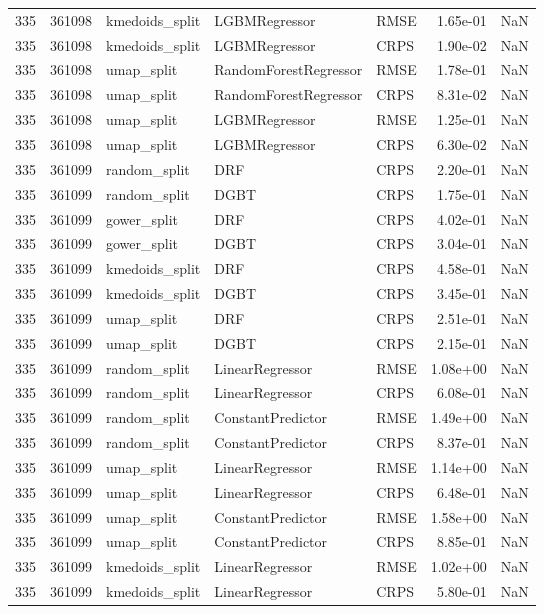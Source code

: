 \begin{tabular}{rrlllrr}
335 & 361098 & kmedoids\_split & LGBMRegressor & RMSE & 1.65e-01 & NaN \\
335 & 361098 & kmedoids\_split & LGBMRegressor & CRPS & 1.90e-02 & NaN \\
335 & 361098 & umap\_split & RandomForestRegressor & RMSE & 1.78e-01 & NaN \\
335 & 361098 & umap\_split & RandomForestRegressor & CRPS & 8.31e-02 & NaN \\
335 & 361098 & umap\_split & LGBMRegressor & RMSE & 1.25e-01 & NaN \\
335 & 361098 & umap\_split & LGBMRegressor & CRPS & 6.30e-02 & NaN \\
335 & 361099 & random\_split & DRF & CRPS & 2.20e-01 & NaN \\
335 & 361099 & random\_split & DGBT & CRPS & 1.75e-01 & NaN \\
335 & 361099 & gower\_split & DRF & CRPS & 4.02e-01 & NaN \\
335 & 361099 & gower\_split & DGBT & CRPS & 3.04e-01 & NaN \\
335 & 361099 & kmedoids\_split & DRF & CRPS & 4.58e-01 & NaN \\
335 & 361099 & kmedoids\_split & DGBT & CRPS & 3.45e-01 & NaN \\
335 & 361099 & umap\_split & DRF & CRPS & 2.51e-01 & NaN \\
335 & 361099 & umap\_split & DGBT & CRPS & 2.15e-01 & NaN \\
335 & 361099 & random\_split & LinearRegressor & RMSE & 1.08e+00 & NaN \\
335 & 361099 & random\_split & LinearRegressor & CRPS & 6.08e-01 & NaN \\
335 & 361099 & random\_split & ConstantPredictor & RMSE & 1.49e+00 & NaN \\
335 & 361099 & random\_split & ConstantPredictor & CRPS & 8.37e-01 & NaN \\
335 & 361099 & umap\_split & LinearRegressor & RMSE & 1.14e+00 & NaN \\
335 & 361099 & umap\_split & LinearRegressor & CRPS & 6.48e-01 & NaN \\
335 & 361099 & umap\_split & ConstantPredictor & RMSE & 1.58e+00 & NaN \\
335 & 361099 & umap\_split & ConstantPredictor & CRPS & 8.85e-01 & NaN \\
335 & 361099 & kmedoids\_split & LinearRegressor & RMSE & 1.02e+00 & NaN \\
335 & 361099 & kmedoids\_split & LinearRegressor & CRPS & 5.80e-01 & NaN \\

\end{tabular}
